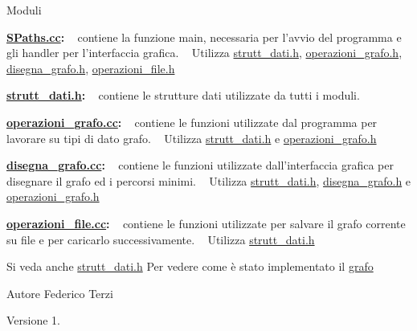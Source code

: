 \begin{DoxyItemize}
\begin{DoxyParagraph}{Moduli}
\begin{DoxyItemize}
\item {\bfseries \hyperlink{SPaths_8cc}{S\+Paths.\+cc}\+:} ~\newline
 contiene la funzione main, necessaria per l'avvio del programma e gli handler per l'interfaccia grafica. ~\newline
 Utilizza {\ttfamily \hyperlink{strutt__dati_8h}{strutt\+\_\+dati.\+h}}, {\ttfamily \hyperlink{operazioni__grafo_8h}{operazioni\+\_\+grafo.\+h}}, {\ttfamily \hyperlink{disegna__grafo_8h}{disegna\+\_\+grafo.\+h}}, {\ttfamily \hyperlink{operazioni__file_8h}{operazioni\+\_\+file.\+h}} 
\item {\bfseries \hyperlink{strutt__dati_8h}{strutt\+\_\+dati.\+h}\+:} ~\newline
 contiene le strutture dati utilizzate da tutti i moduli.
\item {\bfseries \hyperlink{operazioni__grafo_8cc}{operazioni\+\_\+grafo.\+cc}\+:} ~\newline
 contiene le funzioni utilizzate dal programma per lavorare su tipi di dato grafo. ~\newline
 Utilizza {\ttfamily \hyperlink{strutt__dati_8h}{strutt\+\_\+dati.\+h}} e {\ttfamily \hyperlink{operazioni__grafo_8h}{operazioni\+\_\+grafo.\+h}} 
\item {\bfseries \hyperlink{disegna__grafo_8cc}{disegna\+\_\+grafo.\+cc}\+:} ~\newline
 contiene le funzioni utilizzate dall'interfaccia grafica per disegnare il grafo ed i percorsi minimi. ~\newline
 Utilizza {\ttfamily \hyperlink{strutt__dati_8h}{strutt\+\_\+dati.\+h}}, {\ttfamily \hyperlink{disegna__grafo_8h}{disegna\+\_\+grafo.\+h}} e {\ttfamily \hyperlink{operazioni__grafo_8h}{operazioni\+\_\+grafo.\+h}} 
\item {\bfseries \hyperlink{operazioni__file_8cc}{operazioni\+\_\+file.\+cc}\+:} ~\newline
 contiene le funzioni utilizzate per salvare il grafo corrente su file e per caricarlo successivamente. ~\newline
 Utilizza {\ttfamily \hyperlink{strutt__dati_8h}{strutt\+\_\+dati.\+h}} 
\end{DoxyItemize}
\end{DoxyParagraph}
\begin{DoxySeeAlso}{Si veda anche}
\hyperlink{strutt__dati_8h}{strutt\+\_\+dati.\+h} Per vedere come è stato implementato il \hyperlink{structgrafo}{grafo} 
\end{DoxySeeAlso}
\begin{DoxyAuthor}{Autore}
Federico Terzi 
\end{DoxyAuthor}
\begin{DoxyVersion}{Versione}
1. 
\end{DoxyVersion}

\end{DoxyItemize}